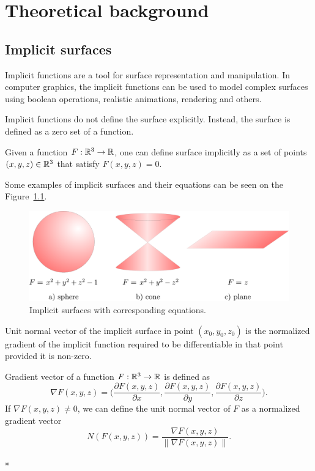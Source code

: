\chapter{Theoretical background}
\label{chap1} %

\section{Implicit surfaces}
\label{sub2.1}

Implicit functions are a tool for surface representation and manipulation.
In computer graphics, the implicit functions can be used to model complex surfaces
using boolean operations, realistic animations, rendering and others.

Implicit functions do not define the surface explicitly. Instead,
the surface is defined as a zero set of a function.
\begin{definition}
    Given a function $F: \mathbb{R}^3 \to \mathbb{R}$, one can define surface implicitly
    as a set of points $(x, y, z)\in \mathbb{R}^3$ that satisfy $F(x, y, z) = 0$.
\end{definition}

Some examples of implicit surfaces and their equations can be seen on
the Figure~\ref{img:1}.

\begin{figure}
    \centerline{\includegraphics[scale=0.5]{images/img1}}
    \caption[Implicit surfaces with corresponding equations]
    {Implicit surfaces with corresponding equations.}
    \label{img:1}
\end{figure}

Unit normal vector of the implicit surface in point $(x_0, y_0, z_0)$ is
the normalized gradient of the implicit function required to be differentiable
in that point provided it is
non-zero.

\begin{definition}
    Gradient vector of a function $F:\mathbb{R}^3 \to \mathbb{R}$ is defined as 
    $$\nabla F(x, y, z) = \bigg(\frac{\partial F(x, y, z)}{\partial x}, \frac{\partial F(x, y, z)}{\partial y}, 
    \frac{\partial F(x, y, z)}{\partial z}\bigg).$$
    If $\nabla F(x,y,z) \neq 0$, we can define the unit normal vector of $F$ as 
    a normalized gradient vector
    $$N(F(x, y, z))  = \frac{\nabla F(x, y, z)}{\| \nabla F(x, y, z) \|}.$$
    \\*
\end{definition}

